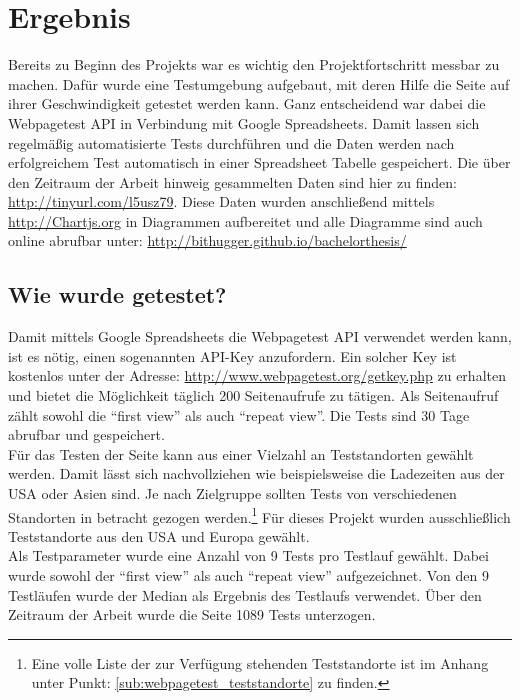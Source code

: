 \section{Ergebnis} %
\label{sec:ergebnis}
	Bereits zu Beginn des Projekts war es wichtig den Projektfortschritt messbar zu machen. Dafür wurde eine Testumgebung aufgebaut, mit deren Hilfe die Seite auf ihrer Geschwindigkeit getestet werden kann. Ganz entscheidend war dabei die Webpagetest API in Verbindung mit Google Spreadsheets. Damit lassen sich regelmäßig automatisierte Tests durchführen und die Daten werden nach erfolgreichem Test automatisch in einer Spreadsheet Tabelle gespeichert. Die über den Zeitraum der Arbeit hinweig gesammelten Daten sind hier zu finden: \url{http://tinyurl.com/l5usz79}. Diese Daten wurden anschließend mittels \url{http://Chartjs.org} in Diagrammen aufbereitet und alle Diagramme sind auch online abrufbar unter: \url{http://bithugger.github.io/bachelorthesis/}

	\subsection{Wie wurde getestet?} %
	\label{sub:wie_wurde_getestet}
		Damit mittels Google Spreadsheets die Webpagetest API verwendet werden kann, ist es nötig, einen sogenannten API-Key anzufordern. Ein solcher Key ist kostenlos unter der Adresse: \url{http://www.webpagetest.org/getkey.php} zu erhalten und bietet die Möglichkeit täglich 200 Seitenaufrufe zu tätigen. Als Seitenaufruf zählt sowohl die "`first view"' als auch "`repeat view"'. Die Tests sind 30 Tage abrufbar und gespeichert.\\

		Für das Testen der Seite kann aus einer Vielzahl an Teststandorten gewählt werden. Damit lässt sich nachvollziehen wie beispielsweise die Ladezeiten aus der USA oder Asien sind. Je nach Zielgruppe sollten Tests von verschiedenen Standorten in betracht gezogen werden.\footnote{Eine volle Liste der zur Verfügung stehenden Teststandorte ist im Anhang unter Punkt: \ref{sub:webpagetest_teststandorte} zu finden.} Für dieses Projekt wurden ausschließlich Teststandorte aus den USA und Europa gewählt.\\

		Als Testparameter wurde eine Anzahl von 9 Tests pro Testlauf gewählt. Dabei wurde sowohl der "`first view"' als auch "`repeat view"' aufgezeichnet. Von den 9 Testläufen wurde der Median als Ergebnis des Testlaufs verwendet. Über den Zeitraum der Arbeit wurde die Seite 1089 Tests unterzogen.\\

